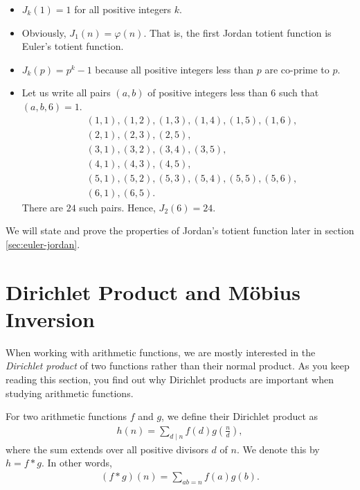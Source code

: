 \documentclass[12pt]{subfile}
\begin{document}
		\begin{example}
			$ $
			\begin{itemize}
				\item $J_k(1)=1$ for all positive integers $k$.
				\item Obviously, $J_1(n)=\varphi(n)$. That is, the first Jordan totient function is Euler's totient function.
				\item $J_k(p)=p^k - 1 $ because all positive integers less than $p$ are co-prime to $p$.
				\item Let us write all pairs $(a,b)$ of positive integers less than $6$ such that $(a,b,6)=1$.
					\begin{align*}
						&(1,1), (1,2), (1, 3), (1, 4), (1, 5), (1,6),\\
						&(2,1), (2,3), (2,5),\\
						&(3,1), (3,2), (3,4), (3,5),\\
						&(4,1), (4,3), (4,5),\\
						&(5,1), (5,2), (5,3), (5,4), (5,5), (5,6),\\
						&(6,1), (6,5).
					\end{align*}
				There are $24$ such pairs. Hence, $J_2(6)=24$.
			\end{itemize}
		\end{example}


We will state and prove the properties of Jordan's totient function later in section \ref{sec:euler-jordan}.
\section{Dirichlet Product and M\" {o}bius Inversion}\label{sec:dirichletmobius}
	When working with arithmetic functions, we are mostly interested in the \textit{Dirichlet product} of two functions rather than their normal product. As you keep reading this section, you find out why Dirichlet products are important when studying arithmetic functions.

		\begin{definition}
			For two arithmetic functions $f$ and $g$, we define their Dirichlet product as
				\begin{align*}
					h(n)=\sum_{d\mid n}f(d)g\left(\frac nd\right),
				\end{align*}
			where the sum extends over all positive divisors $d$ of $n$. We denote this by $h=f\ast g$. In other words,
				\begin{align*}
					(f\ast g)(n)=\sum_{ab=n}f(a)g(b).
				\end{align*}
		\end{definition}
\end{document}
